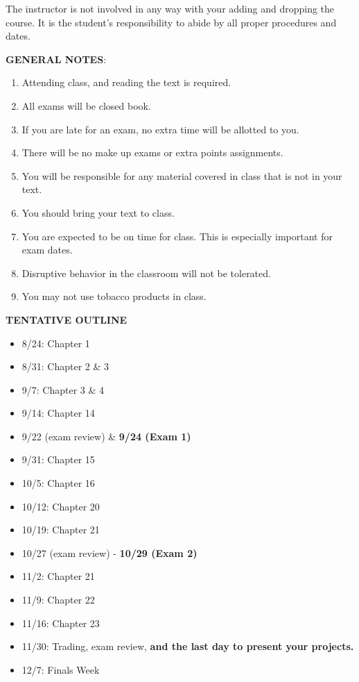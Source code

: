 \documentclass{article}
\begin{document}
The instructor is not involved in any way with your adding and dropping the course.  It is the student's responsibility to abide by all proper procedures and dates.  \\
\begin{center}
{\bf GENERAL NOTES}:
\end{center}
\begin{enumerate}
\item Attending class, and reading the text is required.
\item All exams will be closed book.
\item If you are late for an exam, no extra time will be allotted to you.
\item There will be no make up exams or extra points assignments.
\item You will be responsible for any material covered in class that is not in your text.
\item You should bring your text to class.
\item You are expected to be on time for class. This is especially important for exam
dates.
\item Disruptive behavior in the classroom will not be tolerated.
\item You may not use tobacco products in class.
\end{enumerate}
\begin{center}
\vspace*{5pt}
{\bf TENTATIVE OUTLINE}
\end{center}
\begin{itemize}
\item 8/24: Chapter 1
\item 8/31: Chapter 2 \& 3
\item 9/7: Chapter 3 \& 4
\item 9/14: Chapter 14
\item 9/22 (exam review) \& {\bf 9/24 (Exam 1)}
\item 9/31: Chapter 15
\item 10/5: Chapter 16
\item 10/12: Chapter 20
\item 10/19: Chapter 21
\item 10/27 (exam review) - {\bf 10/29 (Exam 2)}
\item 11/2: Chapter 21
\item 11/9: Chapter 22
\item 11/16: Chapter 23
\item 11/30: Trading, exam review, {\bf and the last day to present your projects.}
\item 12/7: Finals Week
\end{itemize}
\end{document}
